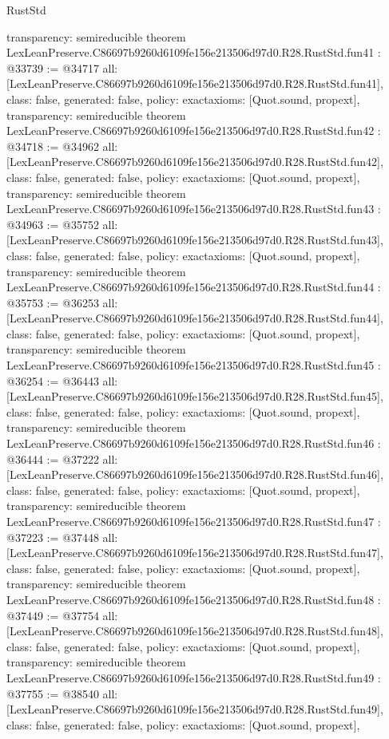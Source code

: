 \begin{lexlean}{RustStd}
\begin{coremodule}
{  transparency: semireducible
}
theorem LexLeanPreserve.C86697b9260d6109fe156e213506d97d0.R28.RustStd.fun41 : @33739 := @34717 {
  all: [LexLeanPreserve.C86697b9260d6109fe156e213506d97d0.R28.RustStd.fun41],
  class: false,
  generated: false,
  policy: exact{axioms: [Quot.sound, propext]},
  transparency: semireducible
}
theorem LexLeanPreserve.C86697b9260d6109fe156e213506d97d0.R28.RustStd.fun42 : @34718 := @34962 {
  all: [LexLeanPreserve.C86697b9260d6109fe156e213506d97d0.R28.RustStd.fun42],
  class: false,
  generated: false,
  policy: exact{axioms: [Quot.sound, propext]},
  transparency: semireducible
}
theorem LexLeanPreserve.C86697b9260d6109fe156e213506d97d0.R28.RustStd.fun43 : @34963 := @35752 {
  all: [LexLeanPreserve.C86697b9260d6109fe156e213506d97d0.R28.RustStd.fun43],
  class: false,
  generated: false,
  policy: exact{axioms: [Quot.sound, propext]},
  transparency: semireducible
}
theorem LexLeanPreserve.C86697b9260d6109fe156e213506d97d0.R28.RustStd.fun44 : @35753 := @36253 {
  all: [LexLeanPreserve.C86697b9260d6109fe156e213506d97d0.R28.RustStd.fun44],
  class: false,
  generated: false,
  policy: exact{axioms: [Quot.sound, propext]},
  transparency: semireducible
}
theorem LexLeanPreserve.C86697b9260d6109fe156e213506d97d0.R28.RustStd.fun45 : @36254 := @36443 {
  all: [LexLeanPreserve.C86697b9260d6109fe156e213506d97d0.R28.RustStd.fun45],
  class: false,
  generated: false,
  policy: exact{axioms: [Quot.sound, propext]},
  transparency: semireducible
}
theorem LexLeanPreserve.C86697b9260d6109fe156e213506d97d0.R28.RustStd.fun46 : @36444 := @37222 {
  all: [LexLeanPreserve.C86697b9260d6109fe156e213506d97d0.R28.RustStd.fun46],
  class: false,
  generated: false,
  policy: exact{axioms: [Quot.sound, propext]},
  transparency: semireducible
}
theorem LexLeanPreserve.C86697b9260d6109fe156e213506d97d0.R28.RustStd.fun47 : @37223 := @37448 {
  all: [LexLeanPreserve.C86697b9260d6109fe156e213506d97d0.R28.RustStd.fun47],
  class: false,
  generated: false,
  policy: exact{axioms: [Quot.sound, propext]},
  transparency: semireducible
}
theorem LexLeanPreserve.C86697b9260d6109fe156e213506d97d0.R28.RustStd.fun48 : @37449 := @37754 {
  all: [LexLeanPreserve.C86697b9260d6109fe156e213506d97d0.R28.RustStd.fun48],
  class: false,
  generated: false,
  policy: exact{axioms: [Quot.sound, propext]},
  transparency: semireducible
}
theorem LexLeanPreserve.C86697b9260d6109fe156e213506d97d0.R28.RustStd.fun49 : @37755 := @38540 {
  all: [LexLeanPreserve.C86697b9260d6109fe156e213506d97d0.R28.RustStd.fun49],
  class: false,
  generated: false,
  policy: exact{axioms: [Quot.sound, propext]},
}
\end{coremodule}
\end{lexlean}
